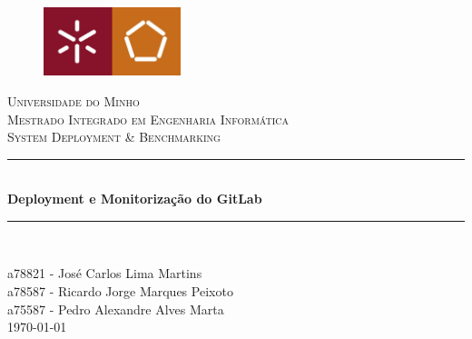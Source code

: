 \documentclass{article}
\begin{document}
\begin{titlepage}
    \center
    \begin{figure}[H]
        \centering
        \includegraphics[width=4cm]{UM_EENG.jpg}
    \end{figure}
    \textsc{\LARGE Universidade do Minho} \\ [1.5cm]
    \textsc{\Large Mestrado Integrado em Engenharia Informática} \\ [0.5cm]
    \textsc{\large System Deployment \& Benchmarking} \\ [0.5cm]
    
    \vspace*{1cm}
    
    \rule{\linewidth}{0.5mm} \\ [0.25cm]
    {\huge \bfseries Deployment e Monitorização do GitLab}
    \rule{\linewidth}{0.5mm} \\ [0.25cm]
    
    \vspace*{1cm}

    a78821 - José Carlos Lima Martins \\
    a78587 - Ricardo Jorge Marques Peixoto \\
    a75587 - Pedro Alexandre Alves Marta \\[0.25cm]

    \today
\end{titlepage}
\end{document}
